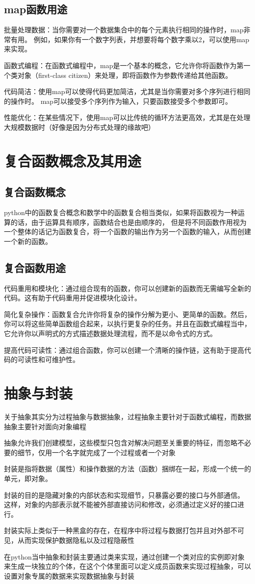 \documentclass[10pt]{article}
\begin{document}
\subsection{map函数用途}
批量处理数据：当你需要对一个数据集合中的每个元素执行相同的操作时，map非常有用。
例如，如果你有一个数字列表，并想要将每个数字乘以2，可以使用map来实现。\par
函数式编程：在函数式编程中，map是一个基本的概念，它允许你将函数作为第一个类对象（first-class citizen）来处理，即将函数作为参数传递给其他函数。\par
代码简洁：使用map可以使得代码更加简洁，尤其是当你需要对多个序列进行相同的操作时。
map可以接受多个序列作为输入，只要函数接受多个参数即可。\par
性能优化：在某些情况下，使用map可以比传统的循环方法更高效，尤其是在处理大规模数据时（好像是因为分布式处理的缘故吧）
\section{复合函数概念及其用途}
\subsection{复合函数概念}
python中的函数复合概念和数学中的函数复合相当类似，如果将函数视为一种运算的话，由于运算具有顺序，函数结合也是由顺序的，
但是将不同函数作用视为一个整体的话记为函数复合，将一个函数的输出作为另一个函数的输入，从而创建一个新的函数。
\subsection{复合函数用途}
代码重用和模块化：通过组合现有的函数，你可以创建新的函数而无需编写全新的代码。这有助于代码重用并促进模块化设计。\par
简化复杂操作：函数复合允许你将复杂的操作分解为更小、更简单的函数。然后，你可以将这些简单函数组合起来，以执行更复杂的任务。并且在函数式编程当中，它允许你以声明式的方式描述数据处理流程，而不是以命令式的方式。\par
提高代码可读性：通过组合函数，你可以创建一个清晰的操作链，这有助于提高代码的可读性和可维护性。

\section{抽象与封装}
关于抽象其实分为过程抽象与数据抽象，过程抽象主要针对于函数式编程，而数据抽象主要针对面向对象编程\par
抽象允许我们创建模型，这些模型只包含对解决问题至关重要的特征，而忽略不必要的细节，仅用一个名字就完成了一个过程或者一个对象\par
封装是指将数据（属性）和操作数据的方法（函数）捆绑在一起，形成一个统一的单元，即对象。\par
封装的目的是隐藏对象的内部状态和实现细节，只暴露必要的接口与外部通信。
这样，对象的内部表示就不能被外部直接访问和修改，必须通过定义好的接口进行。\par
封装实际上类似于一种黑盒的存在，在程序中将过程与数据打包并且对外部不可见，从而实现保护数据隐私以及过程隐蔽性\par
在python当中抽象和封装主要通过类来实现，通过创建一个类对应的实例即对象来生成一块独立的个体，在这个个体里面可以定义成员函数来实现过程抽象，可以设置对象专属的数据来实现数据抽象与封装
\end{document}
